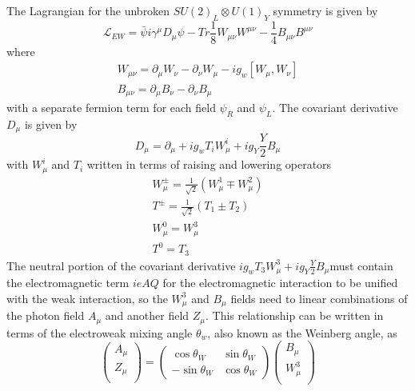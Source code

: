 The Lagrangian for the unbroken $SU(2)_L \otimes U(1)_Y$ symmetry is given by
\begin{equation}
	\mathcal{L}_{EW} = \bar{\psi}i\gamma^\mu D_\mu \psi - Tr\frac{1}{8}W_{\mu \nu}W^{\mu \nu} - \frac{1}{4}B_{\mu \nu}B^{\mu \nu}
	\label{equation:ewlagrangian}
\end{equation}
where 
\begin{eqnarray}
	W_{\mu \nu} = \partial_\mu W_\nu - \partial_\nu W_\mu - ig_w[W_\mu , W_\nu] \\
	B_{\mu \nu} = \partial_\mu B_\nu - \partial_\nu B_\mu
\end{eqnarray}
with a separate fermion term for each field $\psi_R$ and $\psi_L$.  The covariant derivative $D_\mu$ is given by 
\begin{equation}
	D_\mu = \partial_\mu + ig_wT_iW_\mu^i + ig_Y \frac{Y}{2}B_\mu
\end{equation}
with $W_\mu^i$ and $T_i$ written in terms of raising and lowering operators 
\begin{eqnarray}
	W_\mu^\pm = \frac{1}{\sqrt{2}}(W_\mu^1\mp W_\mu^2) \\
	T^\pm = \frac{1}{\sqrt{2}}(T_1 \pm T_2) \\
	W_\mu^0 = W_\mu^3 \\
	T^0 = T_3
\end{eqnarray}
The neutral portion of the covariant derivative $ig_wT_3W_\mu^3 + ig_Y \frac{Y}{2}B_\mu $must contain the electromagnetic term $ieAQ$ for the electromagnetic interaction to be unified with the weak interaction, so the $W_\mu^3$ and $B_\mu$ fields need to linear combinations of the photon field $A_\mu$ and another field $Z_\mu$.  This relationship can be written in terms of the electroweak mixing angle $\theta_w$, also known as the Weinberg angle, as 
\begin{equation}
	\left(
	\begin{array}{c}
		A_\mu \\
		Z_\mu \\
	\end{array}
	\right)
	=
	\left(
	\begin{array}{cc}
		\cos\theta_W & \sin\theta_W \\
		-\sin\theta_W & \cos\theta_W
	\end{array}
	\right)
	\left(
	\begin{array}{c}
		B_\mu \\
		W_\mu^3 \\
	\end{array}
	\right)
\end{equation}
